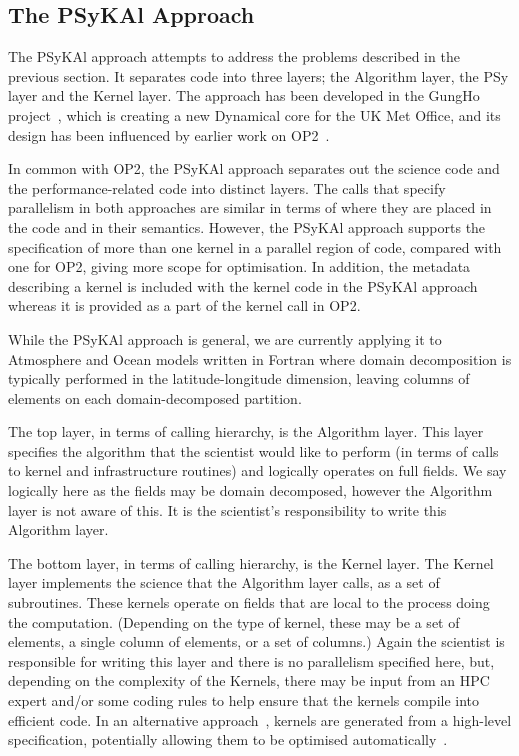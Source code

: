 \documentclass[gmd, manuscript]{copernicus}
\begin{document}
\subsection{The {PS}y{KA}l Approach}

The {PS}y{KA}l approach attempts to address the problems described in
the previous section. It separates code into three layers; the
Algorithm layer, the PSy layer and the Kernel layer. The approach has
been developed in the GungHo project~\citep{GungHo}, which is creating
a new Dynamical core for the UK Met Office, and its design has been
influenced by earlier work on OP2~\citep{OP2, PYOP2}.

In common with OP2, the {PS}y{KA}l approach separates out the science
code and the performance-related code into distinct layers. The calls
that specify parallelism in both approaches are similar in terms of
where they are placed in the code and in their semantics. However, the
{PS}y{KA}l approach supports the specification of more than one kernel
in a parallel region of code, compared with one for OP2, giving more
scope for optimisation. In addition, the metadata describing a kernel
is included with the kernel code in the {PS}y{KA}l approach whereas it
is provided as a part of the kernel call in OP2.

While the {PS}y{KA}l approach is general, we are currently applying it to
Atmosphere and Ocean models written in Fortran where domain
decomposition is typically performed in the latitude-longitude
dimension, leaving columns of elements on each domain-decomposed
partition.

The top layer, in terms of calling hierarchy, is the Algorithm
layer. This layer specifies the algorithm that the scientist would like
to perform (in terms of calls to kernel and infrastructure routines)
and logically operates on full fields. We say logically here as the
fields may be domain decomposed, however the Algorithm layer is not
aware of this. It is the scientist's responsibility to write this
Algorithm layer.

The bottom layer, in terms of calling hierarchy, is the Kernel
layer. The Kernel layer implements the science that the Algorithm
layer calls, as a set of subroutines. These kernels operate on fields
that are local to the process doing the computation. (Depending on the
type of kernel, these may be a set of elements, a single column of
elements, or a set of columns.) Again the scientist is responsible for
writing this layer and there is no parallelism specified here, but,
depending on the complexity of the Kernels, there may be input from an
HPC expert and/or some coding rules to help ensure that the kernels
compile into efficient code.  In an alternative
approach~\citep{firedrake,fenics}, kernels are generated from a
high-level specification, potentially allowing them to be optimised
automatically~\citep{coffee}.
\end{document}

